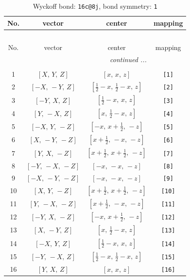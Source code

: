 \documentclass[fleqn,8pt]{jsarticle}
\begin{document}
\begin{longtable}{cccc}
\caption{Wyckoff bond: {\tt 16c@8j}, bond symmetry: {\tt 1}}
 \\
 \hline \hline
No. & vector & center & mapping \\ \hline \endfirsthead

\multicolumn{3}{l}{\tablename\ \thetable{}} \\
 \hline \hline
No. & vector & center & mapping \\ \hline \endhead

 \hline \hline
\multicolumn{3}{r}{\footnotesize\it continued ...} \\ \endfoot

 \hline \hline
\multicolumn{3}{r}{} \\ \endlastfoot

1 & $\left[ X,\, Y,\, Z \right]$ & $\left[ x,\, x,\, z \right]$ & {\tt [1]} \\ \hline
2 & $\left[ - X,\, - Y,\, Z \right]$ & $\left[ \frac{1}{2} - x,\, \frac{1}{2} - x,\, z \right]$ & {\tt [2]} \\ \hline
3 & $\left[ - Y,\, X,\, Z \right]$ & $\left[ \frac{1}{2} - x,\, x,\, z \right]$ & {\tt [3]} \\ \hline
4 & $\left[ Y,\, - X,\, Z \right]$ & $\left[ x,\, \frac{1}{2} - x,\, z \right]$ & {\tt [4]} \\ \hline
5 & $\left[ - X,\, Y,\, - Z \right]$ & $\left[ - x,\, x + \frac{1}{2},\, - z \right]$ & {\tt [5]} \\ \hline
6 & $\left[ X,\, - Y,\, - Z \right]$ & $\left[ x + \frac{1}{2},\, - x,\, - z \right]$ & {\tt [6]} \\ \hline
7 & $\left[ Y,\, X,\, - Z \right]$ & $\left[ x + \frac{1}{2},\, x + \frac{1}{2},\, - z \right]$ & {\tt [7]} \\ \hline
8 & $\left[ - Y,\, - X,\, - Z \right]$ & $\left[ - x,\, - x,\, - z \right]$ & {\tt [8]} \\ \hline
9 & $\left[ - X,\, - Y,\, - Z \right]$ & $\left[ - x,\, - x,\, - z \right]$ & {\tt [9]} \\ \hline
10 & $\left[ X,\, Y,\, - Z \right]$ & $\left[ x + \frac{1}{2},\, x + \frac{1}{2},\, - z \right]$ & {\tt [10]} \\ \hline
11 & $\left[ Y,\, - X,\, - Z \right]$ & $\left[ x + \frac{1}{2},\, - x,\, - z \right]$ & {\tt [11]} \\ \hline
12 & $\left[ - Y,\, X,\, - Z \right]$ & $\left[ - x,\, x + \frac{1}{2},\, - z \right]$ & {\tt [12]} \\ \hline
13 & $\left[ X,\, - Y,\, Z \right]$ & $\left[ x,\, \frac{1}{2} - x,\, z \right]$ & {\tt [13]} \\ \hline
14 & $\left[ - X,\, Y,\, Z \right]$ & $\left[ \frac{1}{2} - x,\, x,\, z \right]$ & {\tt [14]} \\ \hline
15 & $\left[ - Y,\, - X,\, Z \right]$ & $\left[ \frac{1}{2} - x,\, \frac{1}{2} - x,\, z \right]$ & {\tt [15]} \\ \hline
16 & $\left[ Y,\, X,\, Z \right]$ & $\left[ x,\, x,\, z \right]$ & {\tt [16]} \\
\end{longtable}
\end{document}
